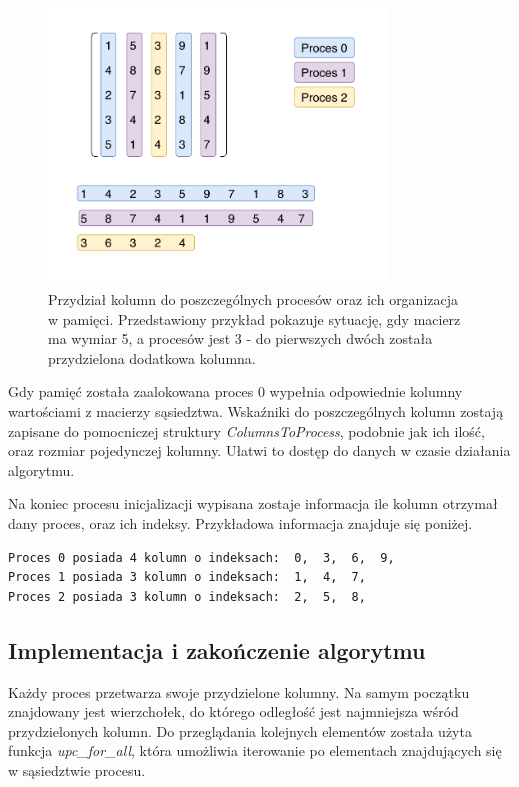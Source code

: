 \documentclass[12pt]{article}
\begin{document}
\begin{figure}[H]
\centering
\includegraphics[width=0.8\textwidth]{data_division.pdf}
\caption{Przydział kolumn do poszczególnych procesów oraz ich organizacja w pamięci. Przedstawiony przykład pokazuje sytuację, gdy macierz ma wymiar 5, a procesów jest 3 - do pierwszych dwóch została przydzielona dodatkowa kolumna.}
\end{figure}

Gdy pamięć została zaalokowana proces 0 wypełnia odpowiednie kolumny wartościami z macierzy sąsiedztwa. Wskaźniki do poszczególnych kolumn zostają zapisane do pomocniczej struktury \textit{ColumnsToProcess}, podobnie jak ich ilość, oraz rozmiar pojedynczej kolumny. Ułatwi to dostęp do danych w czasie działania algorytmu.

Na koniec procesu inicjalizacji wypisana zostaje informacja ile kolumn otrzymał dany proces, oraz ich indeksy. Przykładowa informacja znajduje się poniżej.

\begin{lstlisting}
Proces 0 posiada 4 kolumn o indeksach:  0,  3,  6,  9,
Proces 1 posiada 3 kolumn o indeksach:  1,  4,  7,
Proces 2 posiada 3 kolumn o indeksach:  2,  5,  8,
\end{lstlisting}

\subsection{Implementacja i zakończenie algorytmu}
Każdy proces przetwarza swoje przydzielone kolumny. Na samym początku znajdowany jest wierzchołek, do którego odległość jest najmniejsza wśród przydzielonych kolumn. Do przeglądania kolejnych elementów została użyta funkcja \textit{upc\_for\_all}, która umożliwia iterowanie po elementach znajdujących się w sąsiedztwie procesu.
\end{document}
